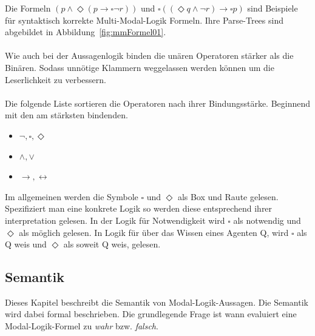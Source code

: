 Die Formeln $(p \wedge \Diamond(p \rightarrow \square \neg r))$ und 
$\square((\Diamond q \wedge \neg r) \rightarrow \square p )$ sind Beispiele für syntaktisch korrekte Multi-Modal-Logik Formeln. Ihre Parse-Trees sind abgebildet in Abbildung~\ref{fig:mmFormel01}.\\
\\
Wie auch bei der Aussagenlogik binden die unären Operatoren stärker als die Binären.
Sodass unnötige Klammern weggelassen werden können um die Leserlichkeit zu verbessern.\\
\\
Die folgende Liste sortieren die Operatoren nach ihrer Bindungsstärke. Beginnend mit den am stärksten bindenden.\\
\begin{itemize}
	\item $\neg, \square, \Diamond$
	\item $\wedge, \vee$
	\item $\rightarrow, \leftrightarrow$
\end{itemize}

Im allgemeinen werden die Symbole $\square$ und $\Diamond$ als Box und Raute gelesen. 
Spezifiziert man eine konkrete Logik so werden diese entsprechend ihrer interpretation gelesen. In der Logik für Notwendigkeit wird $\square$ als notwendig und $\Diamond$ als möglich gelesen. In Logik für über das Wissen eines Agenten Q, wird $\square$ als Q weis und $\Diamond$ als soweit Q weis, gelesen.



\subsection{Semantik} %
\label{sec:semantik}

Dieses Kapitel beschreibt die Semantik von Modal-Logik-Aussagen. 
Die Semantik wird dabei formal beschrieben. Die grundlegende Frage ist wann evaluiert eine Modal-Logik-Formel zu \emph{wahr} bzw. \emph{falsch}.

